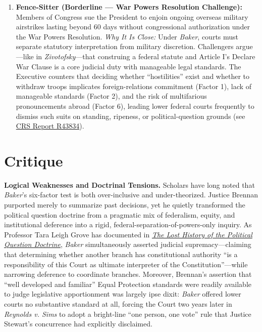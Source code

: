\documentclass[12pt]{article}
\begin{document}
\begin{enumerate}
  \item \textbf{Fence-Sitter (Borderline --- War Powers Resolution Challenge):} Members of Congress sue the President to enjoin ongoing overseas military airstrikes lasting beyond 60 days without congressional authorization under the War Powers Resolution. \textit{Why It Is Close:} Under \textit{Baker}, courts must separate statutory interpretation from military discretion. Challengers argue---like in \textit{Zivotofsky}---that construing a federal statute and Article I's Declare War Clause is a core judicial duty with manageable legal standards. The Executive counters that deciding whether ``hostilities'' exist and whether to withdraw troops implicates foreign-relations commitment (Factor 1), lack of manageable standards (Factor 2), and the risk of multifarious pronouncements abroad (Factor 6), leading lower federal courts frequently to dismiss such suits on standing, ripeness, or political-question grounds (see \href{https://www.everycrsreport.com/reports/R43834.html}{CRS Report R43834}).
\end{enumerate}

\section{Critique}

\textbf{Logical Weaknesses and Doctrinal Tensions.} Scholars have long noted that \textit{Baker}'s six-factor test is both over-inclusive and under-theorized. Justice Brennan purported merely to summarize past decisions, yet he quietly transformed the political question doctrine from a pragmatic mix of federalism, equity, and institutional deference into a rigid, federal-separation-of-powers-only inquiry. As Professor Tara Leigh Grove has documented in \href{https://scholarship.law.wm.edu/cgi/viewcontent.cgi?article=2834&context=facpubs}{\textit{The Lost History of the Political Question Doctrine}}, \textit{Baker} simultaneously asserted judicial supremacy---claiming that determining whether another branch has constitutional authority ``is a responsibility of this Court as ultimate interpreter of the Constitution''---while narrowing deference to coordinate branches. Moreover, Brennan's assertion that ``well developed and familiar'' Equal Protection standards were readily available to judge legislative apportionment was largely ipse dixit: \textit{Baker} offered lower courts no substantive standard at all, forcing the Court two years later in \textit{Reynolds v. Sims} to adopt a bright-line ``one person, one vote'' rule that Justice Stewart's concurrence had explicitly disclaimed.
\end{document}
